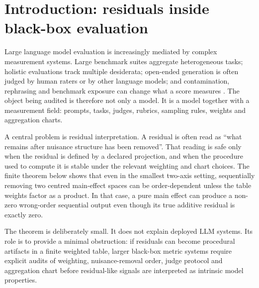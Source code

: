 \documentclass[11pt]{article}
\theoremstyle{remark}
\begin{document}
\section{Introduction: residuals inside black-box evaluation}

Large language model evaluation is increasingly mediated by complex measurement systems. Large benchmark suites aggregate heterogeneous tasks; holistic evaluations track multiple desiderata; open-ended generation is often judged by human raters or by other language models; and contamination, rephrasing and benchmark exposure can change what a score measures \cite{bigbench2022,helm2022,mtbench2023,geval2023,truthfulqa2021,selfcheckgpt2023,decodingtrust2023,llmevalsurvey2023,contamination2024,rethinkingcontamination2023}. The object being audited is therefore not only a model. It is a model together with a measurement field: prompts, tasks, judges, rubrics, sampling rules, weights and aggregation charts.

A central problem is residual interpretation. A residual is often read as ``what remains after nuisance structure has been removed''. That reading is safe only when the residual is defined by a declared projection, and when the procedure used to compute it is stable under the relevant weighting and chart choices. The finite theorem below shows that even in the smallest two-axis setting, sequentially removing two centred main-effect spaces can be order-dependent unless the table weights factor as a product. In that case, a pure main effect can produce a non-zero wrong-order sequential output even though its true additive residual is exactly zero.

The theorem is deliberately small. It does not explain deployed LLM systems. Its role is to provide a minimal obstruction: if residuals can become procedural artifacts in a finite weighted table, larger black-box metric systems require explicit audits of weighting, nuisance-removal order, judge protocol and aggregation chart before residual-like signals are interpreted as intrinsic model properties.
\end{document}
